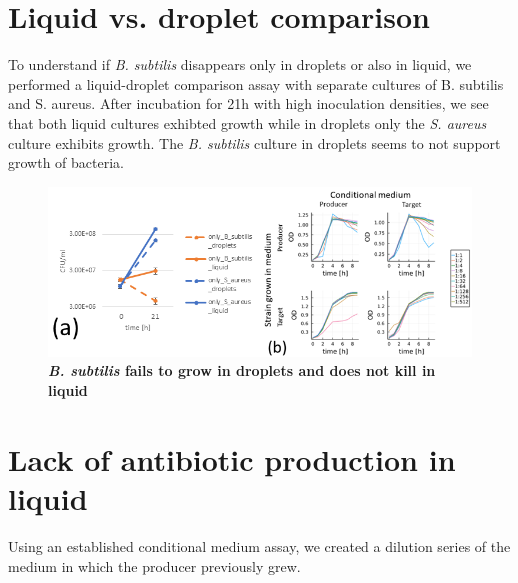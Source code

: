 \section{Liquid vs. droplet comparison}
To understand if \textit{B. subtilis} disappears only in droplets or also in liquid, we performed a liquid-droplet comparison assay with separate cultures of B. subtilis and S. aureus. After incubation for 21h with high inoculation densities, we see that both liquid cultures exhibted growth while in droplets only the \textit{S. aureus} culture exhibits growth. The \textit{B. subtilis} culture in droplets seems to not support growth of bacteria.

\begin{figure}
\centering
\includegraphics[width=\linewidth]{graphics/2025_09_28_droplets_fig6.png}
\caption{\textbf{\textit{B. subtilis} fails to grow in droplets and does not kill in liquid}}
\label{fig:results_liquid_vs_drop_supernatant}
\end{figure}

\section{Lack of antibiotic production in liquid}
Using an established conditional medium assay, we created a dilution series of the medium in which the producer previously grew. 